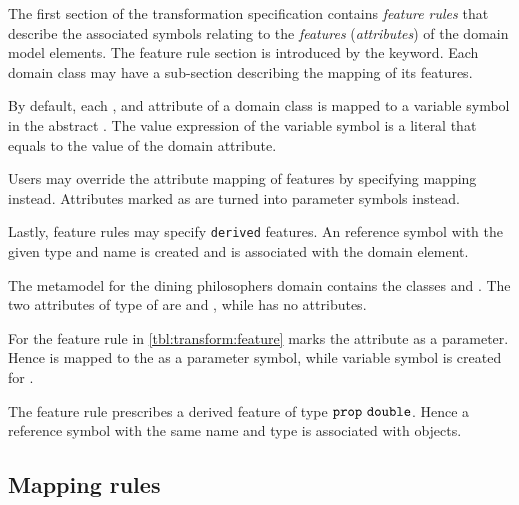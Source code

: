 The first section of the transformation specification contains \emph{feature rules} that describe the associated symbols relating to the \emph{features} (\emph{attributes}) of the domain model elements. The feature rule section is introduced by the  keyword. Each domain class may have a sub-section describing the mapping of its features.

By default, each ,  and  attribute of a domain class is mapped to a  variable symbol in the abstract . The value expression of the variable symbol is a literal that equals to the value of the domain attribute.

Users may override the attribute mapping of  features by specifying  mapping instead. Attributes marked as  are turned into parameter symbols instead.

Lastly, feature rules may specify \texttt{derived} features. An  reference symbol with the given type and name is created and is associated with the domain element.

\begin{runningExample}
  The metamodel for the dining philosophers domain contains the classes  and . The two attributes of type  of  are  and , while  has no attributes.

  For  the feature rule in \vref{tbl:transform:feature} marks the attribute  as a parameter. Hence  is mapped to the  as a parameter symbol, while  variable symbol is created for .

  The  feature rule prescribes a derived feature  of type \(\texttt{\upshape prop}\ \texttt{\upshape double}\). Hence a reference symbol with the same name and type is associated with  objects.
\end{runningExample}

\subsection{Mapping rules}

